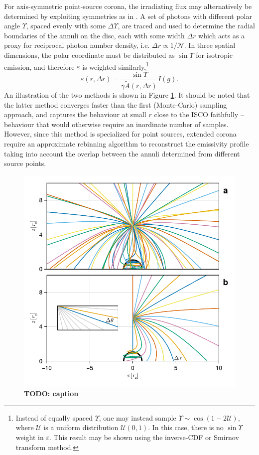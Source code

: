 \documentclass[fleqn,usenatbib]{mnras}
\newcommand{\todo}[1]{{\noindent \bf \color{red} TODO: #1}}
\begin{document}
For axis-symmetric point-source corona, the irradiating flux may alternatively
be determined by exploiting symmetries as in \cite{dauser_irradiation_2013}. A
set of photons with different polar angle $\Upsilon$, spaced evenly with some
$\Delta \Upsilon$, are traced and used to determine the radial boundaries of the
annuli on the disc, each with some width $\Delta r$ which acts as a proxy for
reciprocal photon number density, i.e. $\Delta r \propto 1 / \mathcal{N}$. In
three spatial dimensions, the polar coordinate must be distributed as $\sin
\Upsilon$ for isotropic emission, and therefore $\varepsilon$ is weighted
similarly,\footnote{Instead of equally spaced $\Upsilon$, one may instead sample
$\Upsilon \sim \cos (1 - 2 \mathcal{U})$, where $\mathcal{U}$ is a uniform
distribution $\mathcal{U}(0,1)$. In this case, there is no $\sin \Upsilon$
weight in $\varepsilon$. This result may be shown using the inverse-CDF or
Smirnov transform method.}
\begin{equation}
    \varepsilon(r, \Delta r) = \frac{\sin \Upsilon}{\gamma \tilde{A}(r, \Delta r)} I(g).
\end{equation}
An illustration of the two methods is shown in Figure \ref{fig:coronal-tracing}.
It should be noted that the latter method converges faster than the
first (Monte-Carlo) sampling approach, and captures the behaviour at small $r$
close to the ISCO faithfully -- behaviour that would otherwise require an
inordinate number of samples. However, since this method is specialized for
point sources, extended corona require an approximate rebinning algorithm to
reconstruct the emissivity profile taking into account the overlap between the
annuli determined from different source points.

\begin{figure}
    \centering
    \includegraphics[width=0.95\linewidth]{figures/emissivity.coronal-traces.pdf}
    \caption{\todo{caption}}
    \label{fig:coronal-tracing}
\end{figure}
\end{document}
